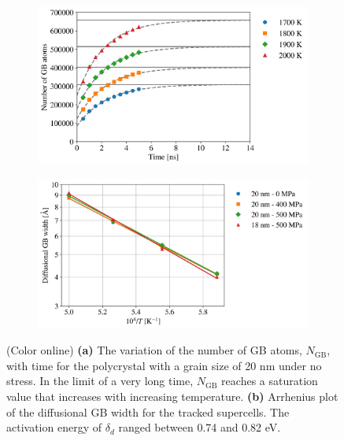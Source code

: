 \documentclass[preprint, 12pt]{elsarticle}
\newcommand{\?}{\stackrel{?}{=}}
\begin{document}
\begin{figure}[h!]
\centering
\begin{subfigure}{0.48\textwidth}
    \includegraphics[width=\textwidth]{NGB-20-0.png}
    \caption{}
    \label{Fig:NGB}
\end{subfigure}
\hfill
\begin{subfigure}{0.48\textwidth}
    \includegraphics[width=\textwidth]{Delta.png}
    \caption{}
    \label{Fig:GBWidth}
\end{subfigure}
\caption{(Color online) \textbf{(a)} The variation of the number of GB atoms, $N_\mathrm{GB}$, with time for the polycrystal with a grain size of 20 nm under no stress. In the limit of a very long time, $N_\mathrm{GB}$ reaches a saturation value that increases with increasing temperature. \textbf{(b)} Arrhenius plot of the diffusional GB width for the tracked supercells. The activation energy of $\delta_d$ ranged between 0.74 and 0.82 eV.}
\end{figure}
\end{document}

